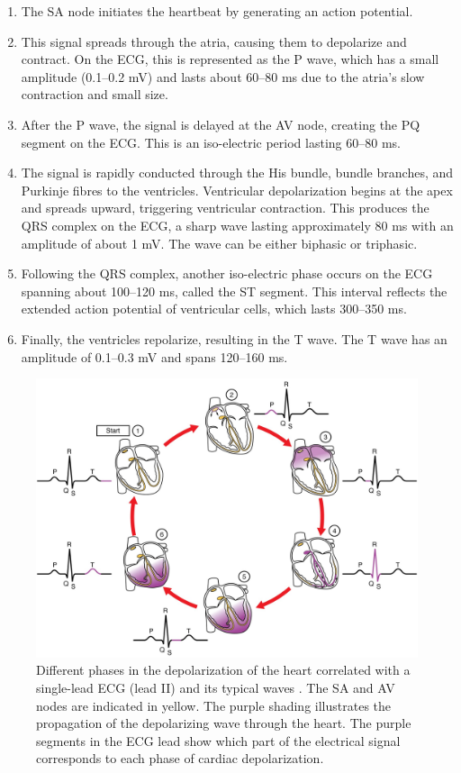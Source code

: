 \begin{enumerate}
    \item The SA node initiates the heartbeat by generating an action potential.
    
    \item This signal spreads through the atria, causing them to depolarize and contract. On the ECG, this is represented as the P wave, which has a small amplitude (0.1–0.2 mV) and lasts about 60–80 ms due to the atria's slow contraction and small size.
    
    \item After the P wave, the signal is delayed at the AV node, creating the PQ segment on the ECG. This is an iso-electric period lasting 60–80 ms.
    
    \item The signal is rapidly conducted through the His bundle, bundle branches, and Purkinje fibres to the ventricles. Ventricular depolarization begins at the apex and spreads upward, triggering ventricular contraction. This produces the QRS complex on the ECG, a sharp wave lasting approximately 80 ms with an amplitude of about 1 mV. The wave can be either biphasic or triphasic.
    
    \item Following the QRS complex, another iso-electric phase occurs on the ECG spanning about 100–120 ms, called the ST segment. This interval reflects the extended action potential of ventricular cells, which lasts 300–350 ms.
    
    \item Finally, the ventricles repolarize, resulting in the T wave. The T wave has an amplitude of 0.1–0.3 mV and spans 120–160 ms.
\end{enumerate}

\begin{figure}
    \centering
    \includegraphics[width=0.7\linewidth]{Figures/1-intro/heart_conduction.jpg}
    \caption{Different phases in the depolarization of the heart correlated with a single-lead ECG (lead II) and its typical waves \cite{openstax_cardiovascular_2022}. The SA and AV nodes are indicated in yellow. The purple shading illustrates the propagation of the depolarizing wave through the heart. The purple segments in the ECG lead show which part of the electrical signal corresponds to each phase of cardiac depolarization.}
    \label{fig:heart_conduction}
\end{figure}

